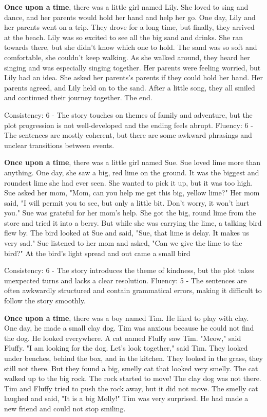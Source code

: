 \documentclass{article}
\begin{document}
\textbf{Once upon a time}, there was a little girl named Lily. She loved to sing and dance, and her parents would hold her hand and help her go. One day, Lily and her parents went on a trip. They drove for a long time, but finally, they arrived at the beach. Lily was so excited to see all the big sand and drinks. She ran towards there, but she didn't know which one to hold. The sand was so soft and comfortable, she couldn't keep walking. As she walked around, they heard her singing and was especially singing together. Her parents were feeling worried, but Lily had an idea. She asked her parents's parents if they could hold her hand. Her parents agreed, and Lily held on to the sand. After a little song, they all smiled and continued their journey together. The end.

Consistency: 6 - The story touches on themes of family and adventure, but the plot progression is not well-developed and the ending feels abrupt.
Fluency: 6 - The sentences are mostly coherent, but there are some awkward phrasings and unclear transitions between events.

\textbf{Once upon a time}, there was a little girl named Sue. Sue loved lime more than anything. One day, she saw a big, red lime on the ground. It was the biggest and roundest lime she had ever seen. She wanted to pick it up, but it was too high. Sue asked her mom, "Mom, can you help me get this big, yellow lime?" Her mom said, "I will permit you to see, but only a little bit. Don't worry, it won't hurt you." Sue was grateful for her mom's help. She got the big, round lime from the store and tried it into a berry. But while she was carrying the lime, a talking bird flew by. The bird looked at Sue and said, "Sue, that lime is delay. It makes us very sad." Sue listened to her mom and asked, "Can we give the lime to the bird?" At the bird's light spread and out came a small bird

Consistency: 6 - The story introduces the theme of kindness, but the plot takes unexpected turns and lacks a clear resolution.
Fluency: 5 - The sentences are often awkwardly structured and contain grammatical errors, making it difficult to follow the story smoothly.

\textbf{Once upon a time}, there was a boy named Tim. He liked to play with clay. One day, he made a small clay dog. Tim was anxious because he could not find the dog. He looked everywhere. A cat named Fluffy saw Tim. "Meow," said Fluffy. "I am looking for the dog. Let's look together," said Tim. They looked under benches, behind the box, and in the kitchen. They looked in the grass, they still not there. But they found a big, smelly cat that looked very smelly. The cat walked up to the big rock. The rock started to move! The clay dog was not there. Tim and Fluffy tried to push the rock away, but it did not move. The smelly cat laughed and said, "It is a big Molly!" Tim was very surprised. He had made a new friend and could not stop smiling.
\end{document}
